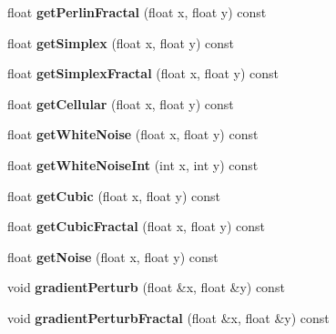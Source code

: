 \begin{DoxyCompactItemize}
\mbox{\label{classnoisefast_ad880a61581a8240e62e9ac7c2063dc0c}} 
float {\bfseries get\+Perlin\+Fractal} (float x, float y) const
\item 
\mbox{\label{classnoisefast_ae403878a6313556fb51104d54df4b262}} 
float {\bfseries get\+Simplex} (float x, float y) const
\item 
\mbox{\label{classnoisefast_a6eff2a60d57dbe47dd5ba02263eb2875}} 
float {\bfseries get\+Simplex\+Fractal} (float x, float y) const
\item 
\mbox{\label{classnoisefast_adeac519b6227697c0023e9b897d750c4}} 
float {\bfseries get\+Cellular} (float x, float y) const
\item 
\mbox{\label{classnoisefast_afd16112bcf6aa3e534244bce53a5a71e}} 
float {\bfseries get\+White\+Noise} (float x, float y) const
\item 
\mbox{\label{classnoisefast_a0659c196e46965d6f49ba891f2baf26b}} 
float {\bfseries get\+White\+Noise\+Int} (int x, int y) const
\item 
\mbox{\label{classnoisefast_a9464d9df49d24fa13c443f60e74ae64f}} 
float {\bfseries get\+Cubic} (float x, float y) const
\item 
\mbox{\label{classnoisefast_acab97b3b43bb59b188fff18b87c215ff}} 
float {\bfseries get\+Cubic\+Fractal} (float x, float y) const
\item 
\mbox{\label{classnoisefast_a13b899456f0ac1bad2f38f31657ede88}} 
float {\bfseries get\+Noise} (float x, float y) const
\item 
\mbox{\label{classnoisefast_a2809ddb8745a8212707f687310dd6f19}} 
void {\bfseries gradient\+Perturb} (float \&x, float \&y) const
\item 
\mbox{\label{classnoisefast_ad977f2f940daf8a1db7435e046c0f926}} 
void {\bfseries gradient\+Perturb\+Fractal} (float \&x, float \&y) const
\item 
\mbox{\label{classnoisefast_a6afa7beb716f92013c7339a308a1ac82}} 

\end{DoxyCompactItemize}
